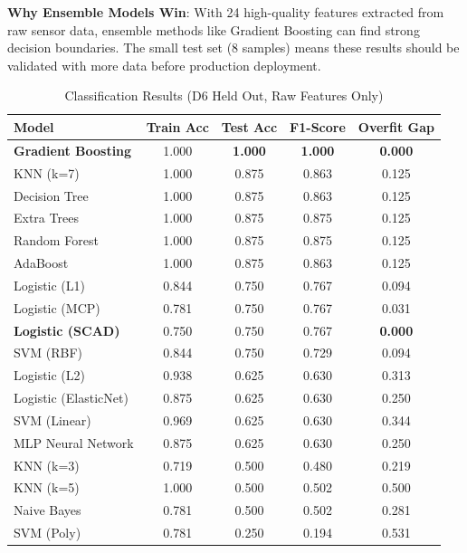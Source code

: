 \documentclass[11pt,a4paper]{article}
\begin{document}
\textbf{Why Ensemble Models Win}: With 24 high-quality features extracted from raw sensor data, ensemble methods like Gradient Boosting can find strong decision boundaries. The small test set (8 samples) means these results should be validated with more data before production deployment.

\begin{table}[H]
\centering
\caption{Classification Results (D6 Held Out, Raw Features Only)}
\begin{tabular}{lcccc}
\toprule
\textbf{Model} & \textbf{Train Acc} & \textbf{Test Acc} & \textbf{F1-Score} & \textbf{Overfit Gap} \\
\midrule
\textbf{Gradient Boosting} & 1.000 & \textbf{1.000} & \textbf{1.000} & \textbf{0.000} \\
KNN (k=7) & 1.000 & 0.875 & 0.863 & 0.125 \\
Decision Tree & 1.000 & 0.875 & 0.863 & 0.125 \\
Extra Trees & 1.000 & 0.875 & 0.875 & 0.125 \\
Random Forest & 1.000 & 0.875 & 0.875 & 0.125 \\
AdaBoost & 1.000 & 0.875 & 0.863 & 0.125 \\
Logistic (L1) & 0.844 & 0.750 & 0.767 & 0.094 \\
Logistic (MCP) & 0.781 & 0.750 & 0.767 & 0.031 \\
\textbf{Logistic (SCAD)} & 0.750 & 0.750 & 0.767 & \textbf{0.000} \\
SVM (RBF) & 0.844 & 0.750 & 0.729 & 0.094 \\
Logistic (L2) & 0.938 & 0.625 & 0.630 & 0.313 \\
Logistic (ElasticNet) & 0.875 & 0.625 & 0.630 & 0.250 \\
SVM (Linear) & 0.969 & 0.625 & 0.630 & 0.344 \\
MLP Neural Network & 0.875 & 0.625 & 0.630 & 0.250 \\
KNN (k=3) & 0.719 & 0.500 & 0.480 & 0.219 \\
KNN (k=5) & 1.000 & 0.500 & 0.502 & 0.500 \\
Naive Bayes & 0.781 & 0.500 & 0.502 & 0.281 \\
SVM (Poly) & 0.781 & 0.250 & 0.194 & 0.531 \\
\bottomrule
\end{tabular}
\end{table}
\end{document}
